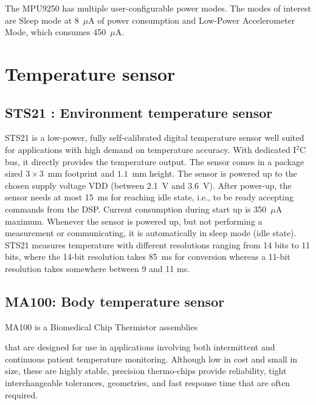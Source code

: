 The MPU9250 has multiple user-configurable power modes. The modes of
interest are Sleep mode at 8~$\mu$A of power consumption and
Low-Power Accelerometer Mode, which consumes 450~$\mu$A. 
 
\section{Temperature sensor}

\subsection{ STS21 : Environment temperature sensor}

STS21 is a low-power, fully self-calibrated digital temperature
sensor well suited for applications with high demand on temperature
accuracy. With dedicated I$^2$C bus, it directly provides the
temperature output. The sensor comes in a package sized $3 \times
3$~mm footprint and $1.1$~mm height. The sensor is powered up to the
chosen supply voltage VDD (between 2.1~V and 3.6~V). After power-up,
the sensor needs at most 15~ms for reaching idle state, i.e., to be
ready accepting commands from the DSP. Current consumption during
start up is 350~$\mu$A maximum. Whenever the sensor is powered up,
but not performing a measurement or communicating, it is
automatically in sleep mode (idle state). STS21 measures temperature
with different resolutions ranging from 14 bits to 11 bits, where the
14-bit resolution takes 85~ms for conversion whereas a 11-bit
resolution takes somewhere between 9 and 11 ms.

\subsection{MA100: Body temperature sensor} 

MA100 is a Biomedical Chip Thermistor assemblies

that are designed for use in applications involving both intermittent
and continuous patient temperature monitoring. Although low in cost
and small in size, these are highly stable, precision thermo-chips
provide reliability, tight interchangeable tolerances, geometries,
and fast response time that are often required.
 
